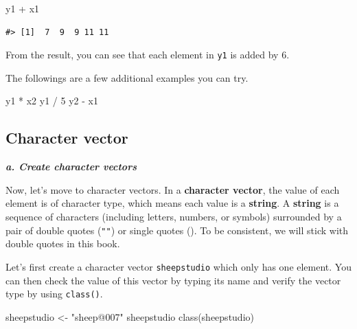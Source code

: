 \documentclass[
]{book}
\newenvironment{Shaded}{\begin{snugshade}}{\end{snugshade}}
\newcommand{\DecValTok}[1]{\textcolor[rgb]{0.00,0.00,0.81}{#1}}
\newcommand{\FunctionTok}[1]{\textcolor[rgb]{0.00,0.00,0.00}{#1}}
\newcommand{\NormalTok}[1]{#1}
\newcommand{\OtherTok}[1]{\textcolor[rgb]{0.56,0.35,0.01}{#1}}
\newcommand{\SpecialCharTok}[1]{\textcolor[rgb]{0.00,0.00,0.00}{#1}}
\newcommand{\StringTok}[1]{\textcolor[rgb]{0.31,0.60,0.02}{#1}}
\begin{document}
\begin{Shaded}
\begin{Highlighting}[]
\NormalTok{y1 }\SpecialCharTok{+}\NormalTok{ x1}
\end{Highlighting}
\end{Shaded}

\begin{verbatim}
#> [1]  7  9  9 11 11
\end{verbatim}

From the result, you can see that each element in \texttt{y1} is added by 6.

The followings are a few additional examples you can try.

\begin{Shaded}
\begin{Highlighting}[]
\NormalTok{y1 }\SpecialCharTok{*}\NormalTok{ x2}
\NormalTok{y1 }\SpecialCharTok{/} \DecValTok{5}
\NormalTok{y2 }\SpecialCharTok{{-}}\NormalTok{ x1}
\end{Highlighting}
\end{Shaded}

\hypertarget{character-vector}{%
\subsection{Character vector}\label{character-vector}}

\textbf{\emph{a. Create character vectors}}

Now, let's move to character vectors. In a \textbf{character vector}, the value of each element is of character type, which means each value is a \textbf{string}. A \textbf{string} is a sequence of characters (including letters, numbers, or symbols) surrounded by a pair of double quotes (\texttt{""}) or single quotes (\texttt{\textquotesingle{}\textquotesingle{}}). To be consistent, we will stick with double quotes in this book.

Let's first create a character vector \texttt{sheepstudio} which only has one element. You can then check the value of this vector by typing its name and verify the vector type by using \texttt{class()}.

\begin{Shaded}
\begin{Highlighting}[]
\NormalTok{sheepstudio }\OtherTok{\textless{}{-}} \StringTok{"sheep@007"} 
\NormalTok{sheepstudio}
\FunctionTok{class}\NormalTok{(sheepstudio)}
\end{Highlighting}
\end{Shaded}
\end{document}
